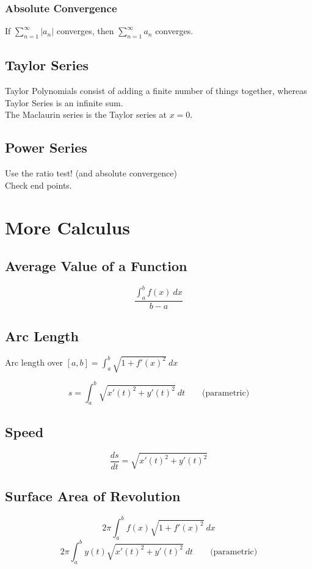 \documentclass[a4paper,10pt]{article}
\begin{document}
\subsubsection*{Absolute Convergence}
If $\displaystyle \sum_{n=1}^{\infty} |a_n|$ converges, then $\displaystyle \sum_{n=1}^{\infty} a_n$ converges.

\subsection*{Taylor Series}
Taylor Polynomials consist of adding a finite number of things together, whereas Taylor Series is an infinite sum.\\
The Maclaurin series is the Taylor series at $x=0$.

\subsection*{Power Series}
Use the ratio test! (and absolute convergence)\\
Check end points.

\section*{More Calculus}
\subsection*{Average Value of a Function}
$$\frac{\displaystyle \int_a^b f(x)\ dx}{b-a}$$

\subsection*{Arc Length}
\begin{center}
Arc length over $\displaystyle[a,b] = \int_a^b \sqrt{1+f'(x)^2}\ dx$\\
\end{center}
$$s = \int_a^b \sqrt{x'(t)^2 + y'(t)^2}\ dt \qquad \mbox{(parametric)}$$

\subsection*{Speed}
$$\frac{ds}{dt} = \sqrt{x'(t)^2 + y'(t)^2}$$

\subsection*{Surface Area of Revolution}
$$2\pi \int_a^b f(x) \sqrt{1+f'(x)^2}\ dx$$
$$2\pi \int_a^b y(t) \sqrt{x'(t)^2 + y'(t)^2}\ dt \qquad \mbox{(parametric)}$$
\end{document}
